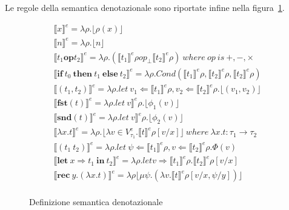 \documentclass{article}
\newcommand{\rec}[2]{\mathbf{rec}\ #1 . ( #2 )}
\newcommand{\letin}[2]{\mathbf{let}\ #1\ \mathbf{in}\ #2}
\newcommand{\ite}[3]{\mathbf{if}\ #1\ \mathbf{then}\ #2\ \mathbf{else}\ #3}
\newcommand{\fst}[1]{\mathbf{fst} (#1)}
\newcommand{\snd}[1]{\mathbf{snd} (#1)}
\newcommand{\lamb}[2]{\lambda #1 . #2}
\begin{document}
Le regole della semantica denotazionale sono riportate infine nella figura~\ref{fig:sem-den}.

\begin{figure}[!t]
    \centering
    \begin{gather*}
        \llbracket x \rrbracket^{e} =  \lambda\rho.\lfloor\rho (x) \rfloor 
        \\ \llbracket n \rrbracket^{e} =  \lambda\rho.\lfloor n \rfloor
        \\ \llbracket t_{1} \mathbf{op} t_{2} \rrbracket^{e} 
            =  \lambda\rho.(\llbracket t_{1} \rrbracket^{e}\rho
            op_{\perp} \llbracket t_{2} \rrbracket^{e}\rho) \ where\ op\ is\ +,-,\times
        \\ \llbracket \ite{t_{0}}{t_{1}}{t_{2}} \rrbracket^{e} = 
            \lambda\rho.Cond(\llbracket t_{1} \rrbracket^{e}\rho, 
                                \llbracket t_{2} \rrbracket^{e}\rho,
                                \llbracket t_{2} \rrbracket^{e}\rho)
        \\ \llbracket (t_{1},t_{2})\rrbracket^{e} =  
            \lambda\rho. let\ v_{1} \Leftarrow \llbracket t_{1} \rrbracket^{e}\rho,
                v_{2} \Leftarrow \llbracket t_{2} \rrbracket^{e}\rho.
                \lfloor (v_{1}, v_{2})\rfloor
        \\ \llbracket \fst{t} \rrbracket^{e} =  \lambda\rho. let\ v \rrbracket^{e}\rho.\lfloor\phi_{1}(v)\rfloor
        \\ \llbracket \snd{t} \rrbracket^{e} =  \lambda\rho. let\ v \rrbracket^{e}\rho.\lfloor\phi_{2}(v)\rfloor
        \\ \llbracket \lamb{x}{t} \rrbracket^{e} =  \lambda\rho.\lfloor\lambda v \in V^{e}_{\tau_{1}}.\llbracket t \rrbracket^{e}\rho [ v / x ] \rfloor \ where\ \lambda x.t : \tau_{1} \rightarrow \tau_{2}
        \\ \llbracket ( t_{1}\ t_{2} ) \rrbracket^{e} = 
            \lambda\rho. let\ \psi \Leftarrow \llbracket t_{1} \rrbracket^{e}\rho,
                v \Leftarrow \llbracket t_{2} \rrbracket^{e}\rho. \Phi(v)
    \\ \llbracket \letin{x \Rightarrow t_{1}}{t_{2}}\rrbracket^{e} =
        \lambda \rho . let v \Rightarrow \llbracket t_{1} \rrbracket^{e}\rho .
        \llbracket t_{2} \rrbracket^{e}\rho[v/x]
    \\ \llbracket \rec{y}{\lambda x.t} \rrbracket^{e} =
        \lambda\rho\lfloor \mu \psi . (\lambda v.\llbracket t \rrbracket^{e} \rho[v/x,\psi/y]) \rfloor
    \\
    \end{gather*}
    \caption{Definizione semantica denotazionale}
    \label{fig:sem-den}
\end{figure}
\end{document}
